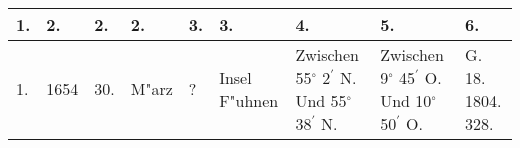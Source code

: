 \documentclass[a4paper, 8pt, oneside, polutonikogreek, german]{article}
\begin{document}
\subsubsection{}
\begin{table}[H]
    \centering
    \swabfamily
    \footnotesize
    \begin{longtable}{|l|l|l|l|l|l|p{13mm}|p{13mm}|p{13mm}|}
    \hline
        1. & 2. & 2. & 2. & 3. & 3. & 4. & 5. & 6. \\ \hline
        1. & 1654 & 30. & M"arz & ? & Insel F"uhnen & Zwischen 55$^\circ$ 2$^\prime$ N. Und 55$^\circ$ 38$^\prime$ N. & Zwischen 9$^\circ$ 45$^\prime$ O. Und 10$^\circ$ 50$^\prime$ O. & G. 18. 1804. 328. \\ \hline
    \end{longtable}
\end{table}
\clearpage
\end{document}
